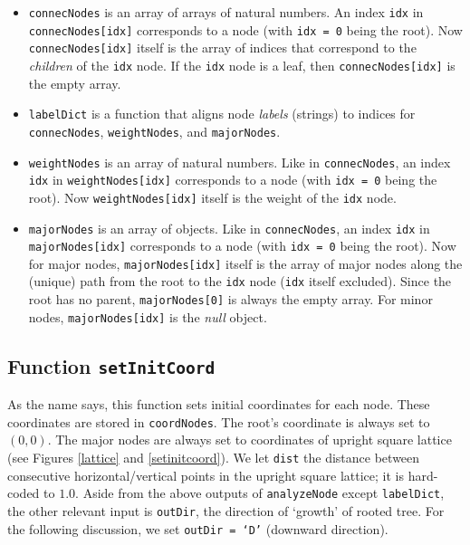\documentclass{article}
\theoremstyle{plain}
\theoremstyle{remark}
\begin{document}
\begin{itemize}
	\item \texttt{connecNodes} is an array of arrays of natural numbers. An index \texttt{idx} in \texttt{connecNodes[idx]} corresponds to a node (with \texttt{idx = 0} being the root). Now \texttt{connecNodes[idx]} itself is the array of indices that correspond to the \textit{children} of the \texttt{idx} node. If the \texttt{idx} node is a leaf, then \texttt{connecNodes[idx]} is the empty array.
	\item \texttt{labelDict} is a function that aligns node \textit{labels} (strings) to indices for \texttt{connecNodes}, \texttt{weightNodes}, and \texttt{majorNodes}.
	\item \texttt{weightNodes} is an array of natural numbers. Like in \texttt{connecNodes}, an index \texttt{idx} in \texttt{weightNodes[idx]} corresponds to a node (with \texttt{idx = 0} being the root). Now \texttt{weightNodes[idx]} itself is the weight of the \texttt{idx} node.
	\item \texttt{majorNodes} is an array of objects. Like in \texttt{connecNodes}, an index \texttt{idx} in \texttt{majorNodes[idx]} corresponds to a node (with \texttt{idx = 0} being the root). Now for major nodes, \texttt{majorNodes[idx]} itself is the array of major nodes along the (unique) path from the root to the \texttt{idx} node (\texttt{idx} itself excluded). Since the root has no parent, \texttt{majorNodes[0]} is always the empty array. For minor nodes, \texttt{majorNodes[idx]} is the \textit{null} object.
\end{itemize}

\subsection{Function \texttt{setInitCoord}}
As the name says, this function sets initial coordinates for each node. These coordinates are stored in \texttt{coordNodes}. The root's coordinate is always set to $(0,0)$. The major nodes are always set to coordinates of upright square lattice (see Figures \ref{lattice} and \ref{setinitcoord}). We let \texttt{dist} the distance between consecutive horizontal/vertical points in the upright square lattice; it is hard-coded to $1.0$. Aside from the above outputs of \texttt{analyzeNode} except \texttt{labelDict}, the other relevant input is \texttt{outDir}, the direction of `growth' of rooted tree. For the following discussion, we set \texttt{outDir = `D'} (downward direction).
\end{document}
